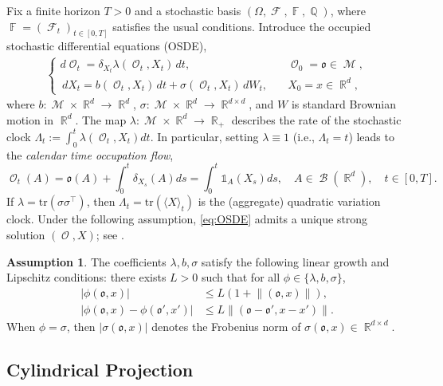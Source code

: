 \documentclass[11pt]{article}
\numberwithin{equation}{section}
\theoremstyle{plain}
\theoremstyle{definition}
\DeclareMathOperator{\F}{\mathbb{F}}
\DeclareMathOperator{\Q}{\mathbb{Q}}
\DeclareMathOperator{\R}{\mathbb{R}}
\DeclareMathOperator{\calB}{\mathcal{B}}
\DeclareMathOperator{\calF}{\mathcal{F}}
\DeclareMathOperator{\calM}{\mathcal{M}}
\DeclareMathOperator{\calO}{\mathcal{O}}
\def\mo{\mathfrak{o}}
\newtheorem{assumption}{Assumption}[section]
\begin{document}
Fix a finite horizon $T>0$ and a stochastic basis $(\Omega, \calF, \F,\Q)$, where $\F = (\calF_t)_{t\in [0,T]}$ satisfies the usual conditions. 
Introduce the occupied stochastic differential equations (OSDE),
\begin{align}
\begin{cases}\label{eq:OSDE}
 d\calO_t= \delta_{X_t}\lambda(\calO_t,X_t) \, dt, & \quad \calO_0 = \mo\in \calM,\\[0.25em]
     \, dX_t = b(\calO_t,X_t) \, dt +   \sigma(\calO_t,X_t) \, dW_t,  & \quad X_0 = x\in \R^d,
  \end{cases}
 \end{align} 
 where $b:\calM\times \R^d\to \R^d$, $\sigma: \calM\times \R^d\to \R^{d\times d}$, and $W$ is  standard Brownian motion in $\R^d$. The map  $\lambda:\calM\times \R^d\to \R_+$ describes the rate of the stochastic clock $\Lambda_t := \int_0^t \lambda(\calO_t,X_t)dt$. In particular, setting $\lambda \equiv 1$ (i.e., $\Lambda_t = t$) leads to  the \textit{calendar time occupation flow},
 $$\calO_t(A) = \mo(A) + \int_0^t\delta_{X_s}(A)ds = \int_0^t\mathds{1}_{A}(X_s)ds, \quad A \in \calB(\R^d), \quad t\in [0,T].$$
 If $\lambda = \text{tr}(\sigma\sigma^\top)$, then $\Lambda_t = \text{tr}(\langle X \rangle_t)$ is the (aggregate) quadratic variation clock.  Under the following assumption, \eqref{eq:OSDE} admits a unique strong solution $(\calO,X)$; see \cite[Lemma 3.2]{SonerTissotZhang}.
 \begin{assumption}\label{asm:growthLip}
     The coefficients $\lambda, b, \sigma$ satisfy the following linear growth and Lipschitz conditions: there exists $L> 0$ such that for all $\phi \in \{\lambda, b, \sigma\}$,
     \begin{align*}
        | \phi(\mo,x) | &\le L(1 + \lVert (\mo,x) \rVert ), \\[0.5em]
        | \phi(\mo,x) - \phi(\mo',x') | &\le L\lVert (\mo - \mo',x - x') \rVert.
     \end{align*}
     When $\phi = \sigma$, then $|\sigma(\mo,x)|$ denotes the Frobenius norm of $\sigma(\mo,x) \in \R^{d\times d}$. 
\end{assumption}

\subsection{Cylindrical Projection}\label{sec:cylinricalProj}
\end{document}
